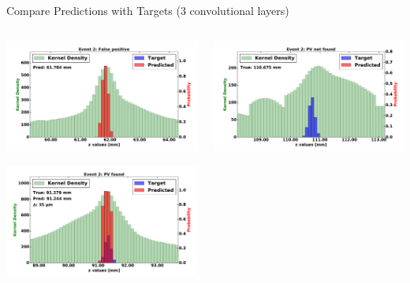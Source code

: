 \begin{frame}{Compare Predictions with Targets (3 convolutional layers)}
  \begin{columns}[c]
        \begin{center}
            \includegraphics[width=1\textwidth,height=0.45\textwidth, trim=18 0 18 0]{images/120000_3layer_12.pdf}
    
            \includegraphics[width=1\textwidth, height=0.45\textwidth,trim=18 0 18 0]{images/120000_3layer_13.pdf}

        \end{center}
        \begin{center}
           \includegraphics[width=1\textwidth, height=0.45\textwidth, trim=18 0 18 0]{images/120000_3layer_14.pdf}
    

\end{center}
\end{columns}
\end{frame}
